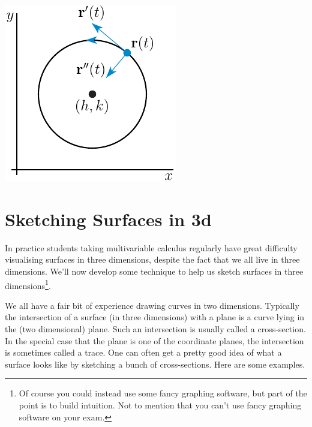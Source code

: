 \begin{eg}
\begin{efig}
\begin{center}
     \includegraphics{circleVA.pdf}
\end{center}
\end{efig}
\end{eg}
\goodbreak

\section{Sketching Surfaces in 3d}\label{sec sketching}

In practice students taking multivariable calculus regularly have great
difficulty visualising surfaces in three dimensions, despite the fact
that we all live in three dimensions. We'll now develop some
technique to help us sketch surfaces in three dimensions\footnote{Of course you could instead use some fancy graphing software, but part of the point is to
build intuition. Not to mention that you can't use fancy graphing software on 
your exam.}.

We all have a fair
bit of experience drawing curves in two dimensions. Typically the intersection
of a surface (in three dimensions) with a plane is a curve lying in 
the (two dimensional) plane. Such an intersection is usually called a cross-section.
In the special case that the plane is one of the coordinate planes, the
intersection is sometimes called a trace. One can often get a pretty good
idea of what a surface looks like by sketching a bunch of cross-sections.
Here are some examples.

